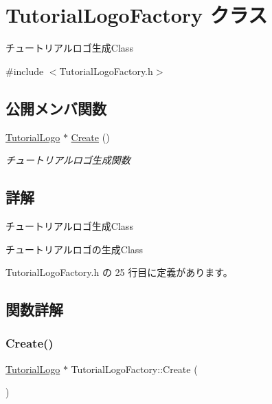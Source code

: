 \hypertarget{class_tutorial_logo_factory}{}\section{Tutorial\+Logo\+Factory クラス}
\label{class_tutorial_logo_factory}


チュートリアルロゴ生成\+Class  




{\ttfamily \#include $<$Tutorial\+Logo\+Factory.\+h$>$}

\subsection*{公開メンバ関数}
\begin{DoxyCompactItemize}
\item 
\mbox{\hyperlink{class_tutorial_logo}{Tutorial\+Logo}} $\ast$ \mbox{\hyperlink{class_tutorial_logo_factory_afe254583e5e79826fe2da8806e360757}{Create}} ()
\begin{DoxyCompactList}\small\item\em チュートリアルロゴ生成関数 \end{DoxyCompactList}\end{DoxyCompactItemize}


\subsection{詳解}
チュートリアルロゴ生成\+Class 

チュートリアルロゴの生成\+Class 

 Tutorial\+Logo\+Factory.\+h の 25 行目に定義があります。



\subsection{関数詳解}
\mbox{\label{class_tutorial_logo_factory_afe254583e5e79826fe2da8806e360757}} 
\subsubsection{\texorpdfstring{Create()}{Create()}}
{\footnotesize\ttfamily \mbox{\hyperlink{class_tutorial_logo}{Tutorial\+Logo}} $\ast$ Tutorial\+Logo\+Factory\+::\+Create (\begin{DoxyParamCaption}{ }\end{DoxyParamCaption})}



